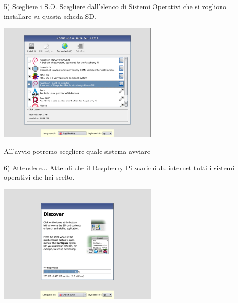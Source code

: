 \documentclass[xcolor=svgnames,11pt]{beamer}
\begin{document}
\begin{frame}{5) Scegliere i S.O.}
Scegliere dall'elenco di Sistemi Operativi che si vogliono installare su questa scheda SD.

\medskip
\begin{center}
\includegraphics[width=8cm]{guide/5.png}
\end{center}

All'avvio potremo scegliere quale sistema avviare

\end{frame}


\begin{frame}{6) Attendere...}
Attendi che il Raspberry Pi scarichi da internet tutti i sistemi operativi che hai scelto.

\medskip
\begin{center}
\includegraphics[width=8cm]{guide/6.png}
\end{center}
\end{frame}
\end{document}
